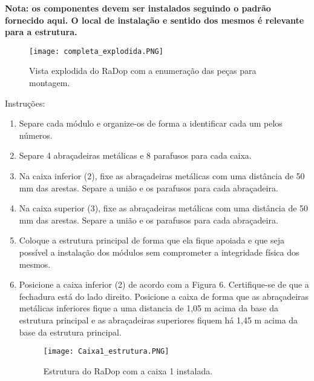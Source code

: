         \textbf{Nota: os componentes devem ser instalados seguindo o padrão fornecido aqui. O local de instalação e sentido dos mesmos é relevante para a estrutura.}
        
        \begin{figure}[H]
            \centering
            \texttt{[image: completa\_explodida.PNG]}
            \caption{Vista explodida do RaDop com a enumeração das peças para montagem.}
            \label{fig:my_label}
        \end{figure}
        
        
        Instruções:
        \begin{enumerate}
            \item Separe cada módulo e organize-os de forma a identificar cada um pelos números.
            
            \item Separe 4 abraçadeiras metálicas e 8 parafusos para cada caixa.
            
            \item Na caixa inferior (2), fixe as abraçadeiras metálicas com uma distância de 50 mm das arestas. Separe a união e os parafusos para cada abraçadeira.
            
            \item Na caixa superior (3), fixe as abraçadeiras metálicas com uma distância de 50 mm das arestas. Separe a união e os parafusos para cada abraçadeira.
            
            \item Coloque a estrutura principal de forma que ela fique apoiada e que seja possível a instalação dos módulos sem comprometer a integridade física dos mesmos. 
            
            \item Posicione a caixa inferior (2) de acordo com a Figura 6. Certifique-se de que a fechadura está do lado direito. Posicione a caixa de forma que as abraçadeiras metálicas inferiores fique a uma distancia de 1,05 m acima da base da estrutura principal e as abraçadeiras superiores fiquem há 1,45 m acima da base da estrutura principal.
            
            \begin{figure}[H]
            \centering
            \texttt{[image: Caixa1\_estrutura.PNG]}
            \caption{Estrutura do RaDop com a caixa 1 instalada.}
            \label{fig:my_label}
        \end{figure}
            

\end{enumerate}
